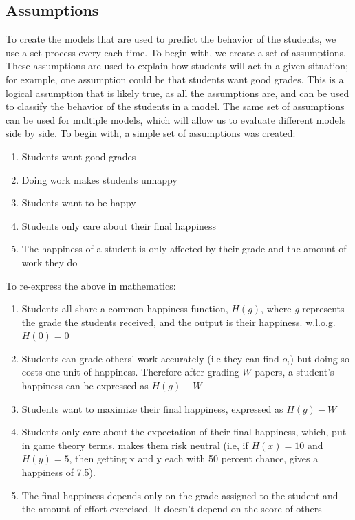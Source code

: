 \documentclass[12pt, Arial]{article}
\begin{document}
\subsection{Assumptions}
To create the models that are used to predict the behavior of the students, we use a set process every each time. To begin with, we create a set of assumptions. These assumptions are used to explain how students will act in a given situation; for example, one assumption could be that students want good grades. This is a logical assumption that is likely true, as all the assumptions are, and can be used to classify the behavior of the students in a model. The same set of assumptions can be used for multiple models, which will allow us to evaluate different models side by side. To begin with, a simple set of assumptions was created:
\begin{enumerate}[itemsep=0pt, parsep=0pt]
	\item Students want good grades
 	\item Doing work makes students unhappy
  	\item Students want to be happy
 	\item Students only care about their final happiness
  	\item The happiness of a student is only affected by their grade and the amount of work they do
\end{enumerate}
To re-express the above in mathematics:
\begin{enumerate}[itemsep=0pt, parsep=0pt]
  \item Students all share a common happiness function, $H(g)$, where \emph{g} represents the grade the students received, and the output is their happiness. w.l.o.g. $H(0)=0$
  \item Students can grade others' work accurately (i.e they can find $o_i$) but doing so costs one unit of happiness. Therefore after grading $W$ papers, a student's happiness can be expressed as $H(g)-W$
  \item Students want to maximize their final happiness, expressed as $H(g)-W$
  \item Students only care about the expectation of their final happiness, which, put in game theory terms, makes them risk neutral (i.e, if $H(x)=10$ and $H(y)=5$, then getting x and y each with 50 percent chance, gives a happiness of 7.5).
  \item The final happiness depends only on the grade assigned to the student and the amount of effort exercised. It doesn't depend on the score of others
\end{enumerate}
\end{document}

